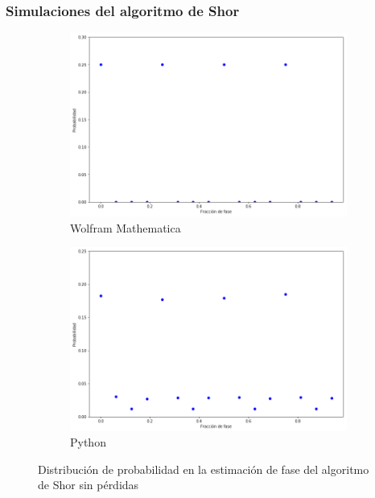 \documentclass[xetex,mathserif,serif]{beamer}
\begin{document}
\begin{frame}
    \frametitle{Simulaciones del algoritmo de Shor}

\begin{figure}[H]
    \centering
    \begin{subfigure}[m]{0.45\textwidth}
        \centering
        \includegraphics[width=0.9\linewidth]{img/ShorM15.png}
        \caption{Wolfram Mathematica}
    \end{subfigure}
    \begin{subfigure}[m]{0.45\textwidth}
        \centering
        \includegraphics[width=0.9\linewidth]{img/shorlossless.png}
        \caption{Python}
    \end{subfigure}
    \caption[Distribución de probabilidad en la estimación de fase del algoritmo de Shor sin pérdidas]{Distribución de probabilidad en la estimación de fase del algoritmo de Shor sin pérdidas}
    \label{fig:shor15}
\end{figure}


\end{frame}
\end{document}
